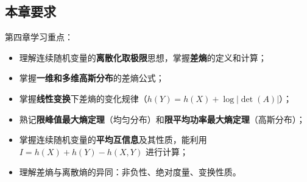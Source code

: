 \subsection{本章要求}
第四章学习重点：
\begin{itemize}
  \item 理解连续随机变量的\textbf{离散化取极限}思想，掌握\textbf{差熵}的定义和计算；
  \item 掌握\textbf{一维和多维高斯分布}的差熵公式；
  \item 掌握\textbf{线性变换}下差熵的变化规律（$h(Y)=h(X)+\log|\det(A)|$）；
  \item 熟记\textbf{限峰值最大熵定理}（均匀分布）和\textbf{限平均功率最大熵定理}（高斯分布）；
  \item 掌握连续随机变量的\textbf{平均互信息}及其性质，能利用 $I=h(X)+h(Y)-h(X,Y)$ 进行计算；
  \item 理解差熵与离散熵的异同：非负性、绝对度量、变换性质。
\end{itemize}
